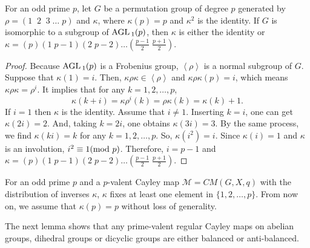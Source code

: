 \documentclass[12pt]{amsart}
\begin{document}
\begin{lemma} \label{affine}
For an odd prime $p$, let $G$ be a permutation group of degree $p$
 generated by $\rho=(1 \;\; 2 \;\;3\; \ldots \; p)$ and
 $\kappa$, where $\kappa(p) = p$ and $\kappa^2$ is the identity.
 If $G$ is isomorphic to a subgroup of ${\mbox{\rm AGL\,}}_1(p)$, then $\kappa$ is either the identity or $\kappa =
 (p)(1\;p-1)(2\;p-2)\ldots(\frac{p-1}{2} \; \frac{p+1}{2})$.
\end{lemma}
\begin{proof}
Because ${\mbox{\rm AGL\,}}_1(p)$ is a Frobenius group, $\left< \rho \right>$ is
a normal  subgroup of $G$.  Suppose that $\kappa(1)=i$. Then,
$\kappa \rho \kappa \in \left< \rho \right>$ and  $\kappa \rho
\kappa(p) = i$, which means $\kappa \rho \kappa = \rho^{i}$. It
implies that for any $k = 1, 2, \ldots, p$,
$$\kappa(k+i) =  \kappa \rho^{i}(k)  = \rho \kappa(k) =
\kappa(k)+1.$$ If $i= 1$ then $\kappa$ is the identity. Assume
that $i\neq 1$. Inserting $k=i$, one can get $\kappa(2i) = 2$.
And, taking $k = 2i$, one obtains $\kappa(3i) = 3$. By the same
process, we find $\kappa(ki) = k$ for any $k = 1, 2, \ldots, p$.
So, $\kappa(i^2) = i$. Since $\kappa(i)=1$ and $\kappa$ is an
involution,  $i^2 \equiv 1  ({\hbox{\rm mod }} p)$. Therefore, $i = p-1$ and
$\kappa =
 (p)(1\;p-1)(2\;p-2)\ldots(\frac{p-1}{2} \; \frac{p+1}{2})$.
\end{proof}

For an odd prime $p$ and a $p$-valent Cayley map $\mathcal{ M} =
CM(G, X, q)$ with the distribution of inverses $\kappa$, $\kappa$
fixes at least one element in $\{1,2, \ldots, p\}$. From now on,
we assume that $\kappa(p) = p$ without loss of generality.

 The next lemma shows that  any prime-valent regular Cayley
maps on abelian groups, dihedral groups or dicyclic groups  are either
balanced or anti-balanced.
\end{document}

